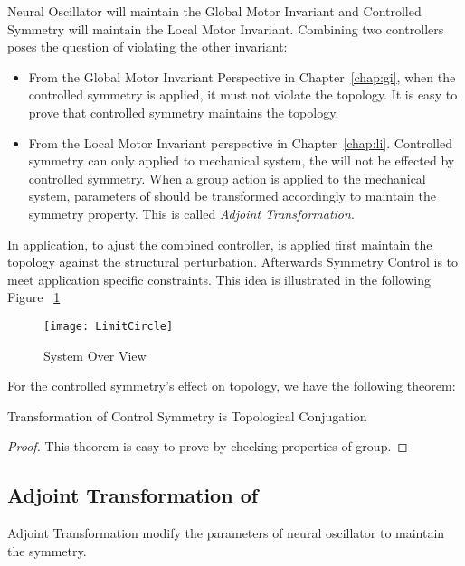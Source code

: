Neural Oscillator will maintain the Global Motor Invariant and Controlled Symmetry will maintain the Local Motor Invariant.
Combining two controllers poses the question of violating the other invariant:
\begin{itemize}
\item From the Global Motor Invariant Perspective in Chapter~\ref{chap:gi},
when the controlled symmetry  is applied, it must not violate the topology. 
It is easy to prove that controlled symmetry maintains the topology.

\item From the Local Motor Invariant perspective in Chapter~\ref{chap:li}.
Controlled symmetry can only applied to mechanical system, the \cpg will not be effected by controlled symmetry.
When a group action is applied to the mechanical system, parameters of \cpg should be transformed accordingly to maintain the symmetry property.
This is called \emph{Adjoint Transformation}.
\end{itemize}


In application, to ajust the combined controller,
\cpg is applied first maintain the topology against the structural perturbation. 
Afterwards Symmetry Control is to meet application specific constraints.
This idea is illustrated in the following Figure ~\ref{fig:sysoverview}

\begin{figure}[!htbp]
  \begin{center}
      \texttt{[image: LimitCircle]}
    \caption{System Over View }
    \label{fig:sysoverview}
  \end{center}
\end{figure}


For the controlled symmetry's effect on topology, we have the following theorem:

\begin{mythe}
Transformation of Control Symmetry is Topological Conjugation
\end{mythe}
\begin{proof}
This theorem is easy to prove by checking properties of group.
\end{proof}

\subsection{Adjoint Transformation of \cpg}
Adjoint Transformation modify the parameters of neural oscillator to maintain the symmetry.


